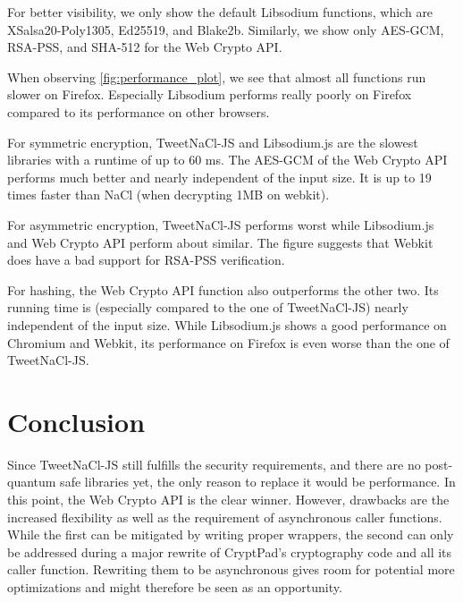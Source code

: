 \documentclass[a4paper, 11pt]{article}
\begin{document}
For better visibility, we only show the default Libsodium functions, which are XSalsa20-Poly1305, Ed25519, and Blake2b.
Similarly, we show only  AES-GCM, RSA-PSS, and SHA-512 for the Web Crypto API.

When observing \cref{fig:performance_plot}, we see that almost all functions run slower on Firefox.
Especially Libsodium performs really poorly on Firefox compared to its performance on other browsers.

For symmetric encryption, TweetNaCl-JS and Libsodium.js are the slowest libraries with a runtime of up to 60 ms.
The AES-GCM of the Web Crypto API performs much better and nearly independent of
the input size.
It is up to 19 times faster than NaCl (when decrypting 1MB on webkit).


For asymmetric encryption, TweetNaCl-JS performs worst while Libsodium.js and Web Crypto API perform about similar.
The figure suggests that Webkit does have a bad support for RSA-PSS verification.

For hashing, the Web Crypto API function also outperforms the other two.
Its running time is (especially compared to the one of TweetNaCl-JS) nearly independent of the input size.
While Libsodium.js shows a good performance on Chromium and Webkit, its performance on Firefox is even worse than the one of TweetNaCl-JS.

\section{Conclusion}

Since TweetNaCl-JS still fulfills the security requirements, and there are no post-quantum safe libraries yet, the only reason to replace it would be performance.
In this point, the Web Crypto API is the clear winner.
However, drawbacks are the increased flexibility as well as the requirement of asynchronous caller functions.
While the first can be mitigated by writing proper wrappers, the second can only be addressed during a major rewrite of CryptPad's cryptography code and all its caller function.
Rewriting them to be asynchronous gives room for potential more optimizations and might therefore be seen as an opportunity.

\printbibliography

\appendix

\end{document}
